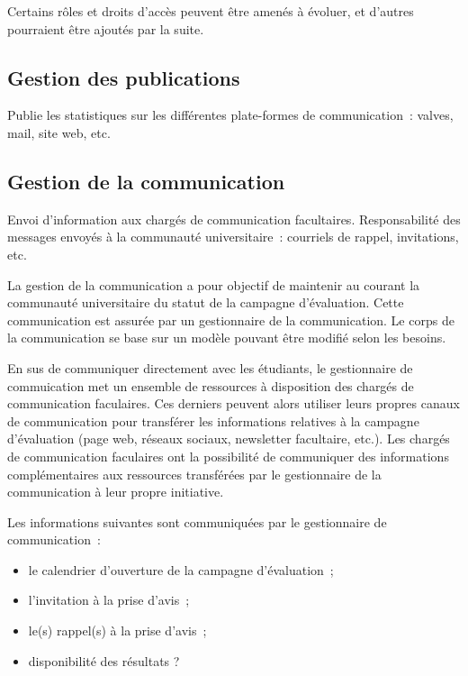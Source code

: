 \documentclass[a4paper,11pt]{report}
\begin{document}
Certains rôles et droits d'accès peuvent être amenés à évoluer, et d'autres pourraient être ajoutés par la suite.






\subsection{Gestion des publications}

Publie les statistiques sur les différentes plate-formes de communication~: valves, mail, site web, etc.




\subsection{Gestion de la communication}

Envoi d'information aux chargés de communication facultaires.
Responsabilité des messages envoyés à la communauté universitaire~: courriels de rappel, invitations, etc.

La gestion de la communication a pour objectif de maintenir au courant la communauté universitaire du statut de la campagne d'évaluation.
Cette communication est assurée par un gestionnaire de la communication.
Le corps de la communication se base sur un modèle pouvant être modifié selon les besoins.

En sus de communiquer directement avec les étudiants, le gestionnaire de commuication met un ensemble de ressources à disposition des chargés de communication faculaires.
Ces derniers peuvent alors utiliser leurs propres canaux de communication pour transférer les informations relatives à la campagne d'évaluation (page web, réseaux sociaux, newsletter facultaire, etc.).
Les chargés de communication faculaires ont la possibilité de communiquer des informations complémentaires aux ressources transférées par le gestionnaire de la communication à leur propre initiative.

\noindent Les informations suivantes sont communiquées par le gestionnaire de communication~:
\begin{itemize}
	\item le calendrier d'ouverture de la campagne d'évaluation~;
	\item l'invitation à la prise d'avis~;
	\item le(s) rappel(s) à la prise d'avis~;
	\item disponibilité des résultats ?
\end{itemize}
\end{document}
